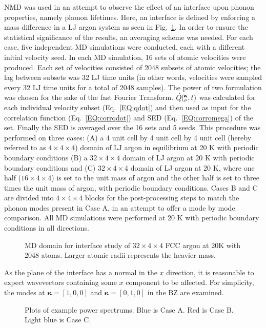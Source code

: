 NMD was used in an attempt to observe the effect of an interface upon phonon properties, namely phonon lifetimes. Here, an interface is defined by enforcing a mass difference in a LJ argon system as seen in Fig.~\ref{fig:interface_domain}. In order to ensure the statistical significance of the results, an averaging scheme was needed. For each case, five independent MD simulations were conducted, each with a different initial velocity seed. In each MD simulation, 16 sets of atomic velocities were produced. Each set of velocities consisted of 2048 subsets of atomic velocities; the lag between subsets was 32 LJ time units (in other words, velocities were sampled every 32 LJ time units for a total of 2048 samples). The power of two formulation was chosen for the sake of the fast Fourier Transform. $\dot{Q}\mspace{-4.0mu}\left(\mspace{-8.0mu} \begin{smallmatrix}&\pmb{\kappa} \\&\nu\end{smallmatrix} \mspace{-2.0mu},t\right)$ was calculated for each individual velocity subset (Eq.~\ref{EQ:qdot}) and then used as input for the correlation function (Eq.~\ref{EQ:corrqdot}) and SED (Eq.~\ref{EQ:corromega}) of the set. Finally the SED is averaged over the 16 sets and 5 seeds. This procedure was performed on three cases: (A) a 4 unit cell by 4 unit cell by 4 unit cell (hereby referred to as $4\times4\times4$) domain of LJ argon in equilibrium at 20 K with periodic boundary conditions (B) a $32\times4\times4$ domain of LJ argon at 20 K with periodic boundary conditions and (C) $32\times4\times4$ domain of LJ argon at 20 K, where one half ($16\times4\times4$) is set to the unit mass of argon and the other half is set to three times the unit mass of argon, with periodic boundary conditions. Cases B and C are divided into $4\times4\times4$ blocks for the post-processing steps to match the phonon modes present in Case A, in an attempt to offer a mode by mode comparison. All MD simulations were performed at 20 K with periodic boundary conditions in all directions.
\begin{figure}%
\begin{center}
\renewcommand{\figure}{Fig.}
\caption{MD domain for interface study of $32\times4\times4$ FCC argon at 20K with 2048 atoms. Larger atomic radii represents the heavier mass.}
\label{fig:interface_domain}
\end{center}
\end{figure}
As the plane of the interface has a normal in the $x$ direction, it is reasonable to expect wavevectors containing some $x$ component to be affected. For simplicity, the modes at $\bm{\kappa}=[1,0,0]$ and $\bm{\kappa}=[0,1,0]$ in the BZ are examined. 
\renewcommand{\topfraction}{1.0}
\begin{figure*}%
\begin{center}
\renewcommand{\figure}{Fig.}
\caption{Plots of example power spectrums. Blue is Case A. Red is Case B. Light blue is Case C.}
\label{fig:sed}
\end{center}
\end{figure*}

